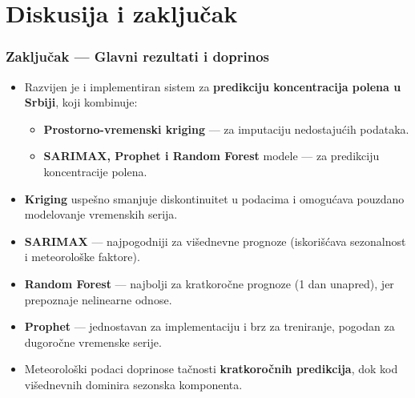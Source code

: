 \section{Diskusija i zaključak}


\begin{frame}
    \frametitle{Zaključak — Glavni rezultati i doprinos}

    \begin{itemize}
        \item Razvijen je i implementiran sistem za \textbf{predikciju koncentracija polena u Srbiji}, koji kombinuje:
        \begin{itemize}
            \item \textbf{Prostorno-vremenski kriging} — za imputaciju nedostajućih podataka.
            \item \textbf{SARIMAX, Prophet i Random Forest} modele — za predikciju koncentracije polena.
        \end{itemize}

        \item \textbf{Kriging} uspešno smanjuje diskontinuitet u podacima i omogućava pouzdano modelovanje vremenskih serija.

        \item \textbf{SARIMAX} — najpogodniji za višednevne prognoze (iskorišćava sezonalnost i meteorološke faktore).

        \item \textbf{Random Forest} — najbolji za kratkoročne prognoze (1 dan unapred), jer prepoznaje nelinearne odnose.

        \item \textbf{Prophet} — jednostavan za implementaciju i brz za treniranje, pogodan za dugoročne vremenske serije.

        \item Meteorološki podaci doprinose tačnosti \textbf{kratkoročnih predikcija}, dok kod višednevnih dominira sezonska komponenta.
    \end{itemize}

\end{frame}


